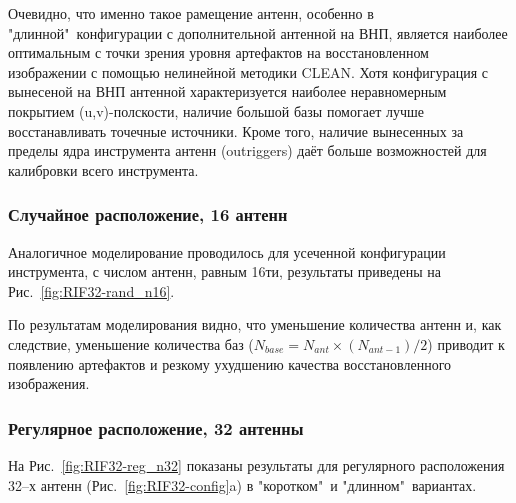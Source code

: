 \documentclass[10pt,a4paper]{article}
\begin{document}
Очевидно, что именно такое рамещение антенн, особенно в "длинной"\ конфигурации с дополнительной антенной на ВНП, является наиболее оптимальным с точки зрения уровня артефактов на восстановленном изображении с помощью нелинейной методики CLEAN. Хотя конфигурация с вынесеной на ВНП антенной характеризуется наиболее неравномерным 
покрытием (u,v)-полскости, наличие большой базы помогает лучше восстанавливать точечные источники. Кроме того, наличие вынесенных 
за пределы ядра инструмента антенн (outriggers) даёт больше возможностей
для калибровки всего инструмента.
   

\subsubsection{Случайное расположение, 16 антенн}

Аналогичное моделирование проводилось для усеченной конфигурации инструмента, с числом антенн, равным 16ти, результаты приведены на Рис.~\ref{fig:RIF32-rand_n16}.

По результатам моделирования видно, что уменьшение количества антенн 
и, как следствие, уменьшение количества баз ($N_{base} = N_{ant}\times(N_{ant-1})/2$) приводит к появлению артефактов и резкому ухудшению качества восстановленного изображения. 

\subsubsection{Регулярное расположение, 32 антенны}

На Рис.~\ref{fig:RIF32-reg_n32} показаны результаты для регулярного расположения 32--х антенн (Рис.~\ref{fig:RIF32-config}a) в "коротком"\ и "длинном"\ вариантах.
\end{document}
